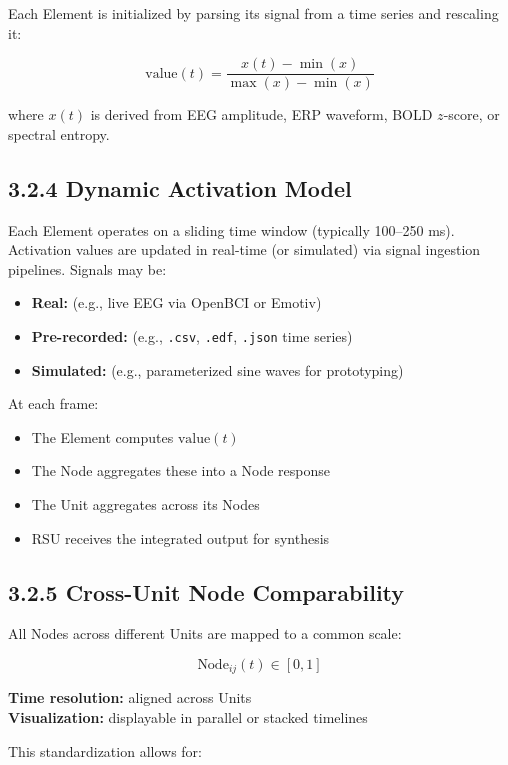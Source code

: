 Each Element is initialized by parsing its signal from a time series and rescaling it:

\[
\text{value}(t) = \frac{x(t) - \min(x)}{\max(x) - \min(x)}
\]

where $x(t)$ is derived from EEG amplitude, ERP waveform, BOLD $z$-score, or spectral entropy.

\subsection*{3.2.4 Dynamic Activation Model}

Each Element operates on a sliding time window (typically 100–250 ms). Activation values are updated in real-time (or simulated) via signal ingestion pipelines. Signals may be:

\begin{itemize}
    \item \textbf{Real:} (e.g., live EEG via OpenBCI or Emotiv)
    \item \textbf{Pre-recorded:} (e.g., \texttt{.csv}, \texttt{.edf}, \texttt{.json} time series)
    \item \textbf{Simulated:} (e.g., parameterized sine waves for prototyping)
\end{itemize}

At each frame:

\begin{itemize}
    \item The Element computes $\text{value}(t)$
    \item The Node aggregates these into a Node response
    \item The Unit aggregates across its Nodes
    \item RSU receives the integrated output for synthesis
\end{itemize}

\subsection*{3.2.5 Cross-Unit Node Comparability}

All Nodes across different Units are mapped to a common scale:

\[
\text{Node}_{ij}(t) \in [0, 1]
\]

\textbf{Time resolution:} aligned across Units\\
\textbf{Visualization:} displayable in parallel or stacked timelines

This standardization allows for:

